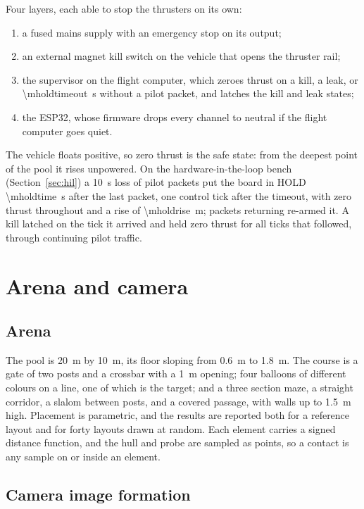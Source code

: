\documentclass[10pt,a4paper]{article}
\begin{document}
Four layers, each able to stop the thrusters on its own:
\begin{enumerate}
\item a fused mains supply with an emergency stop on its output;
\item an external magnet kill switch on the vehicle that opens the thruster rail;
\item the supervisor on the flight computer, which zeroes thrust on a kill, a
leak, or \SI{\mholdtimeout}{\second} without a pilot packet, and latches the
kill and leak states;
\item the ESP32, whose firmware drops every channel to neutral if the flight
computer goes quiet.
\end{enumerate}
The vehicle floats positive, so zero thrust is the safe state: from the
deepest point of the pool it rises unpowered. On the hardware-in-the-loop
bench (Section~\ref{sec:hil}) a \SI{10}{\second} loss of pilot packets put
the board in HOLD \SI{\mholdtime}{\second} after the last packet, one control
tick after the timeout, with zero thrust throughout and a rise of
\SI{\mholdrise}{\metre}; packets returning re-armed it. A kill latched on the
tick it arrived and held zero thrust for all \mkillticks{} ticks that
followed, through continuing pilot traffic.

\section{Arena and camera}\label{sec:arena}

\subsection{Arena}

The pool is \SI{20}{\metre} by \SI{10}{\metre}, its floor sloping from
\SI{0.6}{\metre} to \SI{1.8}{\metre}. The course is a gate of two posts and a
crossbar with a \SI{1}{\metre} opening; four balloons of different colours on
a line, one of which is the target; and a three section maze, a straight
corridor, a slalom between posts, and a covered passage, with walls up to
\SI{1.5}{\metre} high. Placement is parametric, and the results are reported
both for a reference layout and for forty layouts drawn at random. Each
element carries a signed distance function, and the hull and probe are
sampled as points, so a contact is any sample on or inside an element.

\subsection{Camera image formation}
\end{document}
